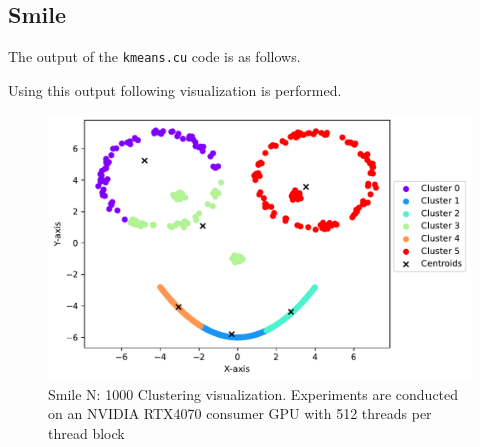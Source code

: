 \subsection{Smile}
The output of the \texttt{kmeans.cu} code is as follows.


Using this output following visualization is performed.
\begin{figure}[H]
    \centering
    \includegraphics[width=.8\textwidth]{figures/plots/smile.pdf}
    \caption{Smile N: 1000 Clustering visualization. Experiments are conducted on an NVIDIA RTX4070 consumer GPU with 512 threads per thread block}
    \label{smile}
\end{figure}



